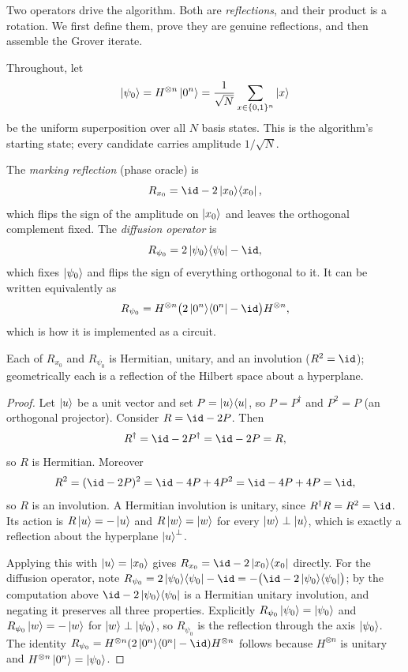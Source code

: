 Two operators drive the algorithm. Both are \emph{reflections}, and their product
is a rotation. We first define them, prove they are genuine reflections, and then
assemble the Grover iterate.

Throughout, let
\[
  \ket{\psi_0}=H^{\otimes n}\ket{0^{n}}=\frac{1}{\sqrt N}\sum_{x\in\{0,1\}^{n}}\ket{x}
\]
be the uniform superposition over all $N$ basis states. This is the algorithm's
starting state; every candidate carries amplitude $1/\sqrt N$.

\begin{definition}
The \emph{marking reflection} (phase oracle) is
\[
  R_{x_0}=\id-2\ketbra{x_0}{x_0},
\]
which flips the sign of the amplitude on $\ket{x_0}$ and leaves the orthogonal
complement fixed. The \emph{diffusion operator} is
\[
  R_{\psi_0}=2\ketbra{\psi_0}{\psi_0}-\id,
\]
which fixes $\ket{\psi_0}$ and flips the sign of everything orthogonal to it.
It can be written equivalently as
\[
  R_{\psi_0}=H^{\otimes n}\bigl(2\ketbra{0^{n}}{0^{n}}-\id\bigr)H^{\otimes n},
\]
which is how it is implemented as a circuit.
\end{definition}

\begin{lemma}
\label{l4:lem:reflections}
Each of $R_{x_0}$ and $R_{\psi_0}$ is Hermitian, unitary, and an involution
($R^2=\id$); geometrically each is a reflection of the Hilbert space about a
hyperplane.
\end{lemma}

\begin{proof}
Let $\ket{u}$ be a unit vector and set $P=\ket{u}\!\bra{u}$, so $P=P^{\dagger}$ and
$P^{2}=P$ (an orthogonal projector). Consider $R=\id-2P$. Then
\[
  R^{\dagger}=\id-2P^{\dagger}=\id-2P=R,
\]
so $R$ is Hermitian. Moreover
\[
  R^{2}=(\id-2P)^{2}=\id-4P+4P^{2}=\id-4P+4P=\id,
\]
so $R$ is an involution. A Hermitian involution is unitary, since
$R^{\dagger}R=R^{2}=\id$. Its action is $R\ket{u}=-\ket{u}$ and $R\ket{w}=\ket{w}$
for every $\ket{w}\perp\ket{u}$, which is exactly a reflection about the hyperplane
$\ket{u}^{\perp}$.

Applying this with $\ket{u}=\ket{x_0}$ gives $R_{x_0}=\id-2\ketbra{x_0}{x_0}$
directly. For the diffusion operator, note
$R_{\psi_0}=2\ketbra{\psi_0}{\psi_0}-\id=-\bigl(\id-2\ketbra{\psi_0}{\psi_0}\bigr)$;
by the computation above $\id-2\ketbra{\psi_0}{\psi_0}$ is a Hermitian unitary
involution, and negating it preserves all three properties. Explicitly
$R_{\psi_0}\ket{\psi_0}=\ket{\psi_0}$ and $R_{\psi_0}\ket{w}=-\ket{w}$ for
$\ket{w}\perp\ket{\psi_0}$, so $R_{\psi_0}$ is the reflection through the axis
$\ket{\psi_0}$.
The identity
$R_{\psi_0}=H^{\otimes n}(2\ketbra{0^{n}}{0^{n}}-\id)H^{\otimes n}$ follows because
$H^{\otimes n}$ is unitary and $H^{\otimes n}\ket{0^{n}}=\ket{\psi_0}$.
\end{proof}

